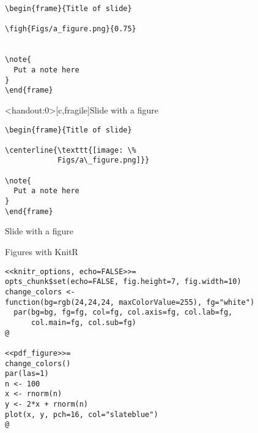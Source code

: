 \documentclass[12pt,t]{beamer}
\begin{document}
\newsavebox{\codeboxthree}
\begin{lrbox}{\codeboxthree}
\begin{lstlisting}
\begin{frame}{Title of slide}

\figh{Figs/a_figure.png}{0.75}


\note{
  Put a note here
}
\end{frame}
\end{lstlisting}
\end{lrbox}


\begin{frame}<handout:0>[c,fragile]{Slide with a figure}

\usebox{\codeboxthree}

\end{frame}

\newsavebox{\codeboxfour}
\begin{lrbox}{\codeboxfour}
\begin{lstlisting}
\begin{frame}{Title of slide}

\centerline{\texttt{[image: \%
            Figs/a\_figure.png]}}

\note{
  Put a note here
}
\end{frame}
\end{lstlisting}
\end{lrbox}


\begin{frame}[c,fragile]{Slide with a figure}
\addtocounter{framenumber}{-1}

\usebox{\codeboxfour}

\end{frame}



\begin{frame}[c,fragile]{Figures with KnitR}

\begin{lstlisting}
<<knitr_options, echo=FALSE>>=
opts_chunk$set(echo=FALSE, fig.height=7, fig.width=10)
change_colors <-
function(bg=rgb(24,24,24, maxColorValue=255), fg="white")
  par(bg=bg, fg=fg, col=fg, col.axis=fg, col.lab=fg,
      col.main=fg, col.sub=fg)
@

<<pdf_figure>>=
change_colors()
par(las=1)
n <- 100
x <- rnorm(n)
y <- 2*x + rnorm(n)
plot(x, y, pch=16, col="slateblue")
@
\end{lstlisting}

\end{frame}
\end{document}
